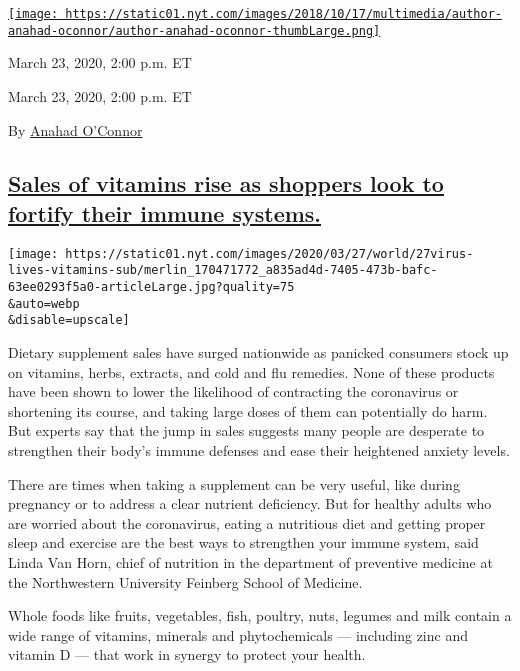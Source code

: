 \href{https://www.nytimes.com/by/anahad-oconnor}{\texttt{[image: https://static01.nyt.com/images/2018/10/17/multimedia/author-anahad-oconnor/author-anahad-oconnor-thumbLarge.png]}}

March 23, 2020, 2:00 p.m. ET

March 23, 2020, 2:00 p.m. ET

By \href{https://www.nytimes.com/by/anahad-oconnor}{Anahad O'Connor}

\hypertarget{sales-of-vitamins-rise-as-shoppers-look-to-fortify-their-immune-systems}{%
\subsection{\texorpdfstring{\protect\hyperlink{sales-of-vitamins-rise-as-shoppers-look-to-fortify-their-immune-systems}{Sales
of vitamins rise as shoppers look to fortify their immune
systems.}}{Sales of vitamins rise as shoppers look to fortify their immune systems.}}\label{sales-of-vitamins-rise-as-shoppers-look-to-fortify-their-immune-systems}}

\texttt{[image: https://static01.nyt.com/images/2020/03/27/world/27virus-lives-vitamins-sub/merlin\_170471772\_a835ad4d-7405-473b-bafc-63ee0293f5a0-articleLarge.jpg?quality=75\\\&auto=webp\\\&disable=upscale]}

Dietary supplement sales have surged nationwide as panicked consumers
stock up on vitamins, herbs, extracts, and cold and flu remedies. None
of these products have been shown to lower the likelihood of contracting
the coronavirus or shortening its course, and taking large doses of them
can potentially do harm. But experts say that the jump in sales suggests
many people are desperate to strengthen their body's immune defenses and
ease their heightened anxiety levels.

There are times when taking a supplement can be very useful, like during
pregnancy or to address a clear nutrient deficiency. But for healthy
adults who are worried about the coronavirus, eating a nutritious diet
and getting proper sleep and exercise are the best ways to strengthen
your immune system, said Linda Van Horn, chief of nutrition in the
department of preventive medicine at the Northwestern University
Feinberg School of Medicine.

Whole foods like fruits, vegetables, fish, poultry, nuts, legumes and
milk contain a wide range of vitamins, minerals and phytochemicals ---
including zinc and vitamin D --- that work in synergy to protect your
health.

